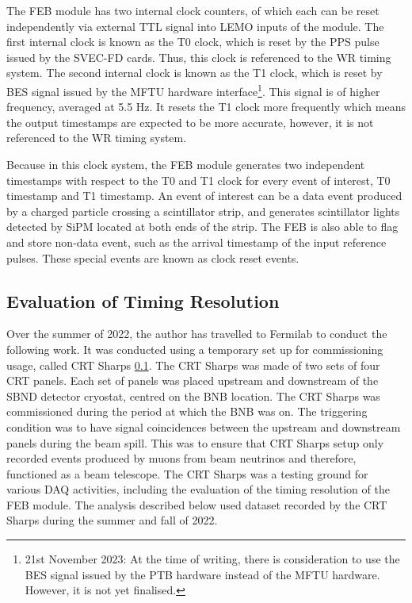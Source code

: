 The FEB module has two internal clock counters, of which each can be reset independently via external TTL signal into LEMO inputs of the module.
The first internal clock is known as the T0 clock, which is reset by the PPS pulse issued by the SVEC-FD cards. 
Thus, this clock is referenced to the WR timing system.
The second internal clock is known as the T1 clock, which is reset by BES signal issued by the MFTU hardware interface\footnote{21st November 2023: At the time of writing, there is consideration to use the BES signal issued by the PTB hardware instead of the MFTU hardware. However, it is not yet finalised. }.
This signal is of higher frequency, averaged at 5.5 Hz.
It resets the T1 clock more frequently which means the output timestamps are expected to be more accurate, however, it is not referenced to the WR timing system.

Because in this clock system, the FEB module generates two independent timestamps with respect to the T0 and T1 clock for every event of interest, T0 timestamp and T1 timestamp.
An event of interest can be a data event produced by a charged particle crossing a scintillator strip, and generates scintillator lights detected by SiPM located at both ends of the strip. 
The FEB is also able to flag and store non-data event, such as the arrival timestamp of the input reference pulses. 
These special events are known as clock reset events.

\subsection{Evaluation of Timing Resolution}

Over the summer of 2022, the author has travelled to Fermilab to conduct the following work.
It was conducted using a temporary set up for commissioning usage, called CRT Sharps \ref{}.
The CRT Sharps was made of two sets of four CRT panels. 
Each set of panels was placed upstream and downstream of the SBND detector cryostat, centred on the BNB location.
The CRT Sharps was commissioned during the period at which the BNB was on. 
The triggering condition was to have signal coincidences between the upstream and downstream panels during the beam spill.
This was to ensure that CRT Sharps setup only recorded events produced by muons from beam neutrinos and therefore, functioned as a beam telescope.
The CRT Sharps was a testing ground for various DAQ activities, including the evaluation of the timing resolution of the FEB module. 
The analysis described below used dataset recorded by the CRT Sharps during the summer and fall of 2022.

